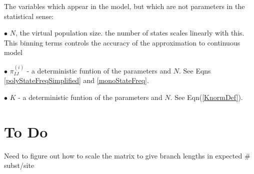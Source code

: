 \documentclass{llncs}
\newcommand{\virtPopSize}{\ensuremath{N}}
\newcommand{\Knorm}{\ensuremath{K}}}
\begin{document}
The variables which appear in the model, but which are not parameters in the statistical sense:
\begin{compactitem}
    \item[$\bullet$] $\virtPopSize$, the virtual population size. the number of states scales linearly with this.
    This binning terms controls the accuracy of the approximation to continuous model
    \item[$\bullet$] $\pi_{IJ}^{(i)}$ - a deterministic funtion of the parameters and \virtPopSize. See Eqns \ref{polyStateFreqSimplified} and \ref{monoStateFreq}.
    \item[$\bullet$] $\Knorm$ - a deterministic funtion of the parameters and \virtPopSize. See Eqn(\ref{KnormDef}).
\end{compactitem}


\section{To Do}
\begin{compactitem}
    \item Need to figure out how to scale the matrix to give branch lengths in expected \# subst/site
\end{compactitem}




 




\end{document}
